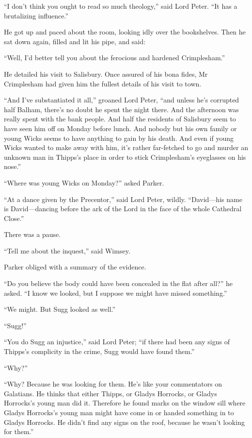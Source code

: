 \enquote{I don’t think you ought to read so much theology,} said Lord Peter. \enquote{It has a brutalizing influence.}

He got up and paced about the room, looking idly over the bookshelves. Then he sat down again, filled and lit his pipe, and said:

\enquote{Well, I’d better tell you about the ferocious and hardened Crimplesham.}

He detailed his visit to Salisbury. Once assured of his bona fides, Mr Crimplesham had given him the fullest details of his visit to town.

\enquote{And I’ve substantiated it all,} groaned Lord Peter, \enquote{and unless he’s corrupted half Balham, there’s no doubt he spent the night there. And the afternoon was really spent with the bank people. And half the residents of Salisbury seem to have seen him off on Monday before lunch. And nobody but his own family or young Wicks seems to have anything to gain by his death. And even if young Wicks wanted to make away with him, it’s rather far-fetched to go and murder an unknown man in Thipps’s place in order to stick Crimplesham’s eyeglasses on his nose.}

\enquote{Where was young Wicks on Monday?} asked Parker.

\enquote{At a dance given by the Precentor,} said Lord Peter, wildly. \enquote{David\allowbreak---\allowbreak his name is David\allowbreak---\allowbreak dancing before the ark of the Lord in the face of the whole Cathedral Close.}

There was a pause.

\enquote{Tell me about the inquest,} said Wimsey.

Parker obliged with a summary of the evidence.

\enquote{Do you believe the body could have been concealed in the flat after all?} he asked. \enquote{I know we looked, but I suppose we might have missed something.}

\enquote{We might. But Sugg looked as well.}

\enquote{Sugg!}

\enquote{You do Sugg an injustice,} said Lord Peter; \enquote{if there had been any signs of Thipps’s complicity in the crime, Sugg would have found them.}

\enquote{Why?}

\enquote{Why? Because he was looking for them. He’s like your commentators on Galatians. He thinks that either Thipps, or Gladys Horrocks, or Gladys Horrocks’s young man did it. Therefore he found marks on the window sill where Gladys Horrocks’s young man might have come in or handed something in to Gladys Horrocks. He didn’t find any signs on the roof, because he wasn’t looking for them.}

